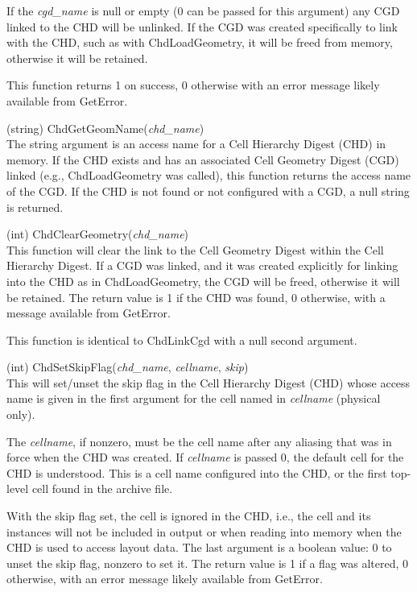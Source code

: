 \begin{description}
If the {\it cgd\_name} is null or empty (0 can be passed for this
argument) any CGD linked to the CHD will be unlinked.  If the CGD was
created specifically to link with the CHD, such as with {\vt
ChdLoadGeometry}, it will be freed from memory, otherwise it will be
retained.

This function returns 1 on success, 0 otherwise with an error message
likely available from {\vt GetError}.

\item{(string) \vt ChdGetGeomName({\it chd\_name\/})}\\
The string argument is an access name for a Cell Hierarchy Digest
(CHD) in memory.  If the CHD exists and has an associated Cell
Geometry Digest (CGD) linked (e.g., {\vt ChdLoadGeometry} was called),
this function returns the access name of the CGD.  If the CHD is not
found or not configured with a CGD, a null string is returned.

\item{(int) \vt ChdClearGeometry({\it chd\_name\/})}\\
This function will clear the link to the Cell Geometry Digest within
the Cell Hierarchy Digest.  If a CGD was linked, and it was created
explicitly for linking into the CHD as in {\vt ChdLoadGeometry}, the CGD
will be freed, otherwise it will be retained.  The return value is 1
if the CHD was found, 0 otherwise, with a message available from {\vt
GetError}.

This function is identical to {\vt ChdLinkCgd} with a null second
argument.

\item{(int) \vt ChdSetSkipFlag({\it chd\_name\/}, {\it cellname\/},
   {\it skip\/})}\\
This will set/unset the skip flag in the Cell Hierarchy Digest (CHD)
whose access name is given in the first argument for the cell named in
{\it cellname} (physical only).

The {\it cellname}, if nonzero, must be the cell name after any
aliasing that was in force when the CHD was created.  If {\it
cellname} is passed 0, the default cell for the CHD is understood. 
This is a cell name configured into the CHD, or the first top-level
cell found in the archive file.

With the skip flag set, the cell is ignored in the CHD, i.e., the cell
and its instances will not be included in output or when reading into
memory when the CHD is used to access layout data.  The last argument
is a boolean value:  0 to unset the skip flag, nonzero to set it.  The
return value is 1 if a flag was altered, 0 otherwise, with an error
message likely available from {\vt GetError}.


\end{description}
